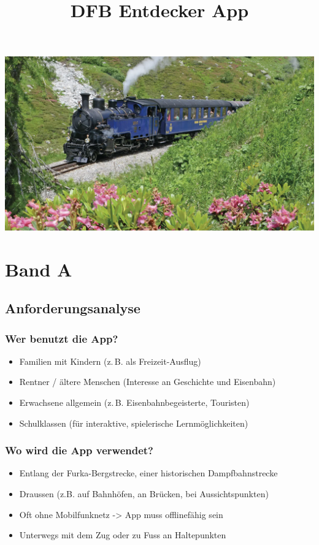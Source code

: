 \documentclass[10pt]{article}
\title{DFB Entdecker App}
\begin{document}
	\maketitle
	\includegraphics[width=17.5cm]{title}
	\pagebreak
	\tableofcontents
	\pagebreak
	\section{Band A}
	\subsection{Anforderungsanalyse}
	\subsubsection[Wer]{Wer benutzt die App?}
	\begin{itemize}
		\item Familien mit Kindern (z.\,B. als Freizeit-Ausflug)
		\item Rentner / ältere Menschen (Interesse an Geschichte und Eisenbahn)
		\item Erwachsene allgemein (z.\,B. Eisenbahnbegeisterte, Touristen)
		\item Schulklassen (für interaktive, spielerische Lernmöglichkeiten)
	\end{itemize}
	\subsubsection[Wo]{Wo wird die App verwendet?}
	\begin{itemize}
		\item Entlang der Furka-Bergstrecke, einer historischen Dampfbahnstrecke
		\item Draussen (z.B. auf Bahnhöfen, an Brücken, bei Aussichtspunkten)
		\item Oft ohne Mobilfunknetz -> App muss offlinefähig sein
		\item Unterwegs mit dem Zug oder zu Fuss an Haltepunkten
	\end{itemize}
\end{document}

